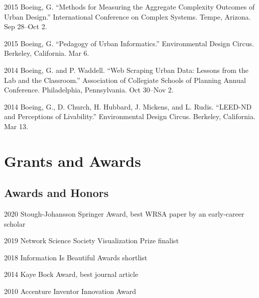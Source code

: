 \documentclass[12pt,letterpaper]{report}
\begin{document}
\begin{tablist}
        \item[2015] \tab Boeing, G. \enquote{Methods for Measuring the Aggregate Complexity Outcomes of Urban Design.} International Conference on Complex Systems. Tempe, Arizona. Sep 28--Oct 2.

        \item[2015] \tab Boeing, G. \enquote{Pedagogy of Urban Informatics.} Environmental Design Circus. Berkeley, California. Mar 6.

        \item[2014] \tab Boeing, G. and P. Waddell. \enquote{Web Scraping Urban Data: Lessons from the Lab and the Classroom.} Association of Collegiate Schools of Planning Annual Conference. Philadelphia, Pennsylvania. Oct 30--Nov 2.

        \item[2014] \tab Boeing, G., D. Church, H. Hubbard, J. Mickens, and L. Rudis. \enquote{LEED-ND and Perceptions of Livability.} Environmental Design Circus. Berkeley, California. Mar 13.

    \end{tablist}



    \section*{Grants and Awards}

    \subsection*{Awards and Honors}

    \begin{tablist}

        \item[2020] \tab Stough-Johansson Springer Award, best WRSA paper by an early-career scholar

        \item[2019] \tab Network Science Society Visualization Prize finalist

        \item[2018] \tab Information Is Beautiful Awards shortlist

        \item[2014] \tab Kaye Bock Award, best journal article

        \item[2010] \tab Accenture Inventor Innovation Award

    \end{tablist}
\end{document}
